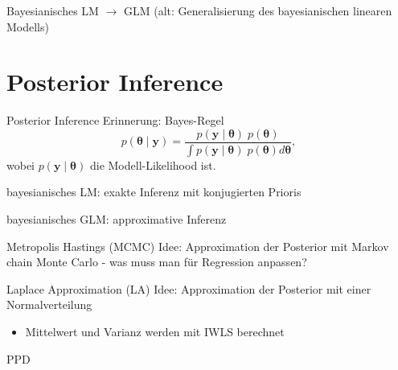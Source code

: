 \documentclass[
  ignorenonframetext,
  aspectratio=169,
]{beamer}
\providecommand{\tightlist}{%
  \setlength{\itemsep}{0pt}\setlength{\parskip}{0pt}}
\newcommand{\by}{\bm{y}}
\newcommand{\btheta}{\bm{\theta}}
\begin{document}
\begin{frame}{Bayesianisches LM \(\to\) GLM (alt: Generalisierung des
bayesianischen linearen Modells)}
\protect{}\label{bayesianisches-lm-to-glm-alt-generalisierung-des-bayesianischen-linearen-modells}
\end{frame}

\section{Posterior Inference}\label{posterior-inference}

\begin{frame}{Posterior Inference}
Erinnerung: Bayes-Regel
\[p(\btheta \mid \by) = \frac{p(\by \mid \btheta) \; p(\btheta)}{\int p(\by \mid \btheta) \; p(\btheta) d \btheta},\]
wobei \(p(\by \mid \btheta)\) die Modell-Likelihood ist.
\end{frame}

\begin{frame}{bayesianisches LM: exakte Inferenz mit konjugierten
Prioris}
\protect{}\label{bayesianisches-lm-exakte-inferenz-mit-konjugierten-prioris}
\end{frame}

\begin{frame}{bayesianisches GLM: approximative Inferenz}
\protect{}\label{bayesianisches-glm-approximative-inferenz}
\begin{block}{Metropolis Hastings (MCMC)}
\protect{}\label{metropolis-hastings-mcmc}
Idee: Approximation der Posterior mit Markov chain Monte Carlo - was
muss man für Regression anpassen?
\end{block}

\begin{block}{Laplace Approximation (LA)}
\protect{}\label{laplace-approximation-la}
Idee: Approximation der Posterior mit einer Normalverteilung

\begin{itemize}
\tightlist
\item
  Mittelwert und Varianz werden mit IWLS berechnet
\end{itemize}
\end{block}

\begin{block}{PPD}
\protect{}\label{ppd}
\end{block}
\end{frame}
\end{document}
